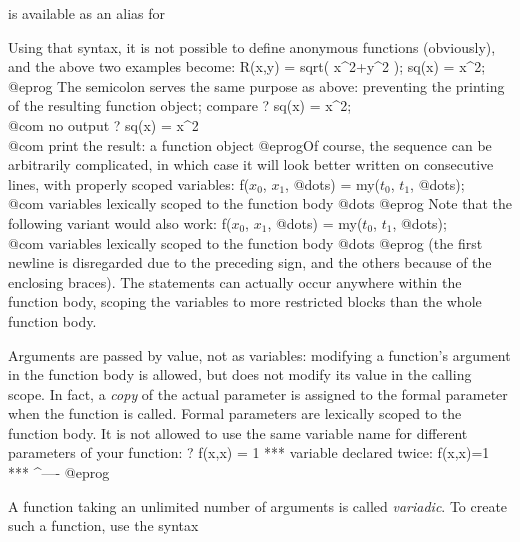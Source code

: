 
\noindent is available as an alias for


\noindent Using that syntax, it is not possible to define anonymous functions
(obviously), and the above two examples become:
\bprog
R(x,y) = sqrt( x^2+y^2 );
sq(x) = x^2;
@eprog\noindent
The semicolon serves the same purpose as above: preventing the printing
of the resulting function object; compare
\bprog
? sq(x) = x^2;  \\@com no output
? sq(x) = x^2   \\@com print the result: a function object
@eprog\noindent Of course, the sequence  can be arbitrarily
complicated, in which case it will look better written on consecutive lines,
with properly scoped variables:
\bprogpart
{
f($x_0$, $x_1$, @dots) =
  my($t_0$, $t_1$, @dots); \\@com variables lexically scoped to the function body
  @dots
}
@eprog \noindent Note that the following variant would also work:
\bprogpart
f($x_0$, $x_1$, @dots) =
{
  my($t_0$, $t_1$, @dots); \\@com variables lexically scoped to the function body
  @dots
}
@eprog \noindent
(the first newline is disregarded due to the preceding \kbd{=} sign, and the
others because of the enclosing braces). The  statements can actually
occur anywhere within the function body, scoping the variables to more
restricted blocks than the whole function body.

Arguments are passed by value, not as variables: modifying a function's
argument in the function body is allowed, but does not modify its value in the
calling scope. In fact, a \emph{copy} of the actual parameter is assigned to
the formal parameter when the function is called. Formal parameters are
lexically scoped to the function body. It is not allowed to use the same
variable name for different parameters of your function:
\bprog
? f(x,x) = 1
  ***   variable declared twice: f(x,x)=1
  ***                                ^----
@eprog


A function taking an unlimited number of arguments is called \emph{variadic}.
To create such a function, use the syntax


